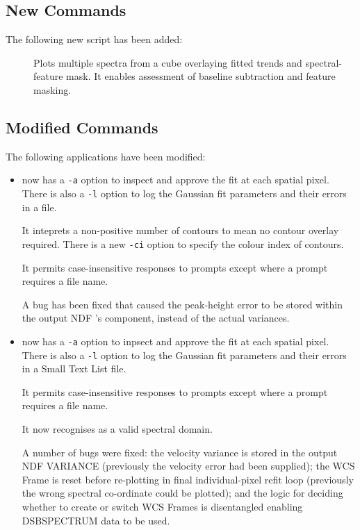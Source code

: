 \documentclass[twoside,11pt,nolof]{starlink}
\begin{document}
\subsection{New Commands}
The following new script has been added:

\begin{description}
   \item [] \mbox{}
     Plots multiple spectra from a cube overlaying fitted trends and
     spectral-feature mask.  It enables assessment of baseline
     subtraction and feature masking.
\end{description}

\subsection{Modified Commands}
The following applications have been modified:

\begin{itemize}

\item {} now has  a \texttt{-a} option to
inspect and approve the fit at each spatial pixel.  There is also a
\texttt{-l} option to log the Gaussian fit parameters and their errors in
a  file.

It inteprets a non-positive number of contours to mean no contour
overlay required.  There is a new \texttt{-ci} option to specify the
colour index of contours.

It permits case-insensitive responses to prompts except where a
prompt requires a file name.

A bug has been fixed that caused the peak-height error to be stored
within the output NDF 's 
component, instead of the actual variances.

\item {} now has a \texttt{-a} option to
inpsect and approve the fit at each spatial pixel. There is also a
\texttt{-l} option to log the Gaussian fit parameters and their errors in
a Small Text List file.

It permits case-insensitive responses to prompts except where a
prompt requires a file name.

It now recognises  as a valid
spectral domain.

A number of bugs were fixed: the velocity variance is stored in the
output NDF VARIANCE (previously the velocity error had been supplied);
the WCS Frame is reset before re-plotting in final individual-pixel
refit loop (previously the wrong spectral co-ordinate could be
plotted); and the logic for deciding whether to create or switch WCS
Frames is disentangled enabling DSBSPECTRUM data to be used.

\end{itemize}
\end{document}
